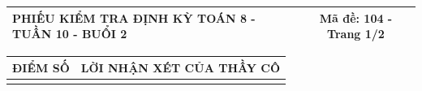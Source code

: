 \documentclass[12pt,a4paper]{article}
\begin{document}
\newpage
\noindent
\begin{tabularx}{\linewidth}{|X|c|}
\hline
\textbf{PHIẾU KIỂM TRA ĐỊNH KỲ TOÁN 8 - TUẦN 10 - BUỔI 2} & \textbf{Mã đề: 104 - Trang 1/2} \\
\hline
\end{tabularx}

\vspace{1.2mm}

\noindent
\begin{tabularx}{\linewidth}{|p{3.2cm}|X|}
\hline
\centering\textbf{ĐIỂM SỐ} & \centering\textbf{LỜI NHẬN XÉT CỦA THẦY CÔ} \tabularnewline
\hline
\rule{0pt}{1.8cm} & \tabularnewline
\hline
\end{tabularx}
\end{document}
